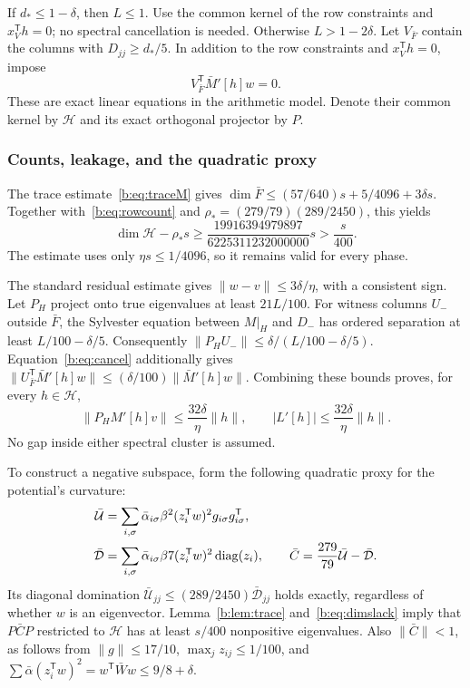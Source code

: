 \documentclass[11pt]{amsart}
\theoremstyle{definition}\newtheorem{definition}[theorem]{Definition}
\theoremstyle{remark}\newtheorem{remark}[theorem]{Remark}
\numberwithin{equation}{section}
\newcommand{\diag}{\operatorname{diag}}
\newcommand{\T}{\mathsf T}
\begin{document}
If $d_*\le1-\delta$, then $L\le1$. Use the common kernel of the row
constraints and $x_V^\T h=0$; no spectral cancellation is needed.
Otherwise $L>1-2\delta$. Let $V_{\bar F}$ contain the columns with
$D_{jj}\ge d_*/5$. In addition to the row constraints and $x_V^\T h=0$, impose
\begin{equation}\label{b:eq:cancel}
 V_{\bar F}^\T\bar M'[h]w=0.
\end{equation}
These are exact linear equations in the arithmetic model. Denote their
common kernel by $\mathcal H$ and its exact orthogonal projector by $P$.

\subsubsection{Counts, leakage, and the quadratic proxy}
The trace estimate~\eqref{b:eq:traceM} gives
$\dim\bar F\le(57/640)s+5/4096+3\delta s$.
Together with~\eqref{b:eq:rowcount} and
$\rho_*=(279/79)(289/2450)$, this yields
\begin{equation}\label{b:eq:dimslack}
 \dim\mathcal H-\rho_*s
 \ge\frac{19916394979897}{6225311232000000}s>\frac{s}{400}.
\end{equation}
The estimate uses only $\eta s\le1/4096$, so it remains valid for every phase.

The standard residual estimate gives $\|w-v\|\le3\delta/\eta$, with a
consistent sign. Let $P_H$ project onto true eigenvalues at least $21L/100$.
For witness columns $U_-$ outside $\bar F$, the Sylvester equation between
$M|_H$ and $D_-$ has ordered separation at least $L/100-\delta/5$.
Consequently
$\|P_HU_-\|\le\delta/(L/100-\delta/5)$.
Equation~\eqref{b:eq:cancel} additionally gives
$\|U_{\bar F}^\T\bar M'[h]w\|\le(\delta/100)\|\bar M'[h]w\|$.
Combining these bounds proves, for every $h\in\mathcal H$,
\begin{equation}\label{b:eq:leaknew}
 \|P_HM'[h]v\|\le\frac{32\delta}{\eta}\|h\|,
 \qquad |L'[h]|\le\frac{32\delta}{\eta}\|h\|.
\end{equation}
No gap inside either spectral cluster is assumed.

To construct a negative subspace, form the following quadratic proxy
for the potential's curvature:
\begin{align}\label{b:eq:proxy}
 \bar{\mathcal U}&=\sum_{i,\sigma}\bar\alpha_{i\sigma}\beta^2
              (z_i^\T w)^2g_{i\sigma}g_{i\sigma}^\T,\notag\\
 \bar{\mathcal D}&=\sum_{i,\sigma}\bar\alpha_{i\sigma}\beta7
              (z_i^\T w)^2\diag(z_i),\qquad
 \bar C=\frac{279}{79}\bar{\mathcal U}-\bar{\mathcal D}.
\end{align}
Its diagonal domination
$\bar{\mathcal U}_{jj}\le(289/2450)\bar{\mathcal D}_{jj}$ holds exactly,
regardless of whether $w$ is an eigenvector.
Lemma~\ref{b:lem:trace} and~\eqref{b:eq:dimslack} imply that $P\bar C P$ restricted
to $\mathcal H$ has at least $s/400$ nonpositive eigenvalues. Also
$\|\bar C\|<1$, as follows from $\|g\|\le17/10$,
$\max_jz_{ij}\le1/100$, and
$\sum\bar\alpha(z_i^\T w)^2=w^\T\bar Ww\le9/8+\delta$.
\end{document}
